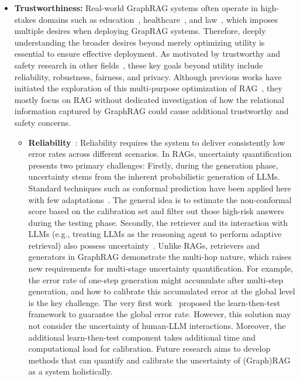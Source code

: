 \begin{itemize}[leftmargin=*]
    \item \textbf{Trustworthiness:}
    Real-world GraphRAG systems often operate in high-stakes domains such as education~\cite{Thway2023Battling}, healthcare~\cite{Xiong2023Benchmarking, Zakka2023Almanac}, and law~\cite{Wiratunga2023CBR}, which imposes multiple desires when deploying GrapRAG systems. Therefore, deeply understanding the broader desires beyond merely optimizing utility is essential to ensure effective deployment. As motivated by trustworthy and safety research in other fields~\citep{chen2024fairness, huang2024position, wang2024safety}, these key goals beyond utility include reliability, robustness, fairness, and privacy. Although previous works have initiated the exploration of this multi-purpose optimization of RAG~\cite{wagle2023empirical, zhou2024trustworthiness}, they mostly focus on RAG without dedicated investigation of how the relational information captured by GraphRAG could cause additional trustworthy and safety concerns. 
    \begin{itemize}
        \item \textbf{Reliability}~\cite{kumar2023conformalpredictionlargelanguage, quach2024conformallanguagemodeling, su2024apienoughconformalprediction, ye2024benchmarkingllmsuncertaintyquantification, li2023traq, ni2024towards}: Reliability requires the system to deliver consistently low error rates across different scenarios. In RAGs, uncertainty quantification presents two primary challenges: Firstly, during the generation phase, uncertainty stems from the inherent probabilistic generation of LLMs. Standard techniques such as conformal prediction have been applied here with few adaptations~\cite{kumar2023conformalpredictionlargelanguage, quach2024conformallanguagemodeling, su2024apienoughconformalprediction, ye2024benchmarkingllmsuncertaintyquantification}. The general idea is to estimate the non-conformal score based on the calibration set and filter out those high-risk answers during the testing phase. Secondly, the retriever and its interaction with LLMs (e.g., treating LLMs as the reasoning agent to perform adaptive retrieval) also possess uncertainty~\cite{li2023traq, ni2024towards}. Unlike RAGs, retrievers and generators in GraphRAG demonstrate the multi-hop nature, which raises new requirements for multi-stage uncertainty quantification. For example, the error rate of one-step generation might accumulate after multi-step generation, and how to calibrate this accumulated error at the global level is the key challenge. The very first work~\cite{ni2024towards} proposed the learn-then-test framework to guarantee the global error rate. However, this solution may not consider the uncertainty of human-LLM interactions. Moreover, the additional learn-then-test component takes additional time and computational load for calibration. Future research aims to develop methods that can quantify and calibrate the uncertainty of (Graph)RAG as a system holistically.


\end{itemize}
\end{itemize}
